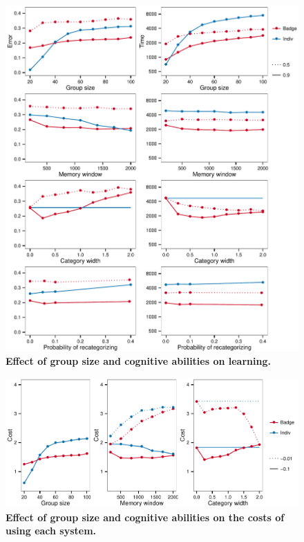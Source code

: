 \begin{figure}
\label{parameters}
\includegraphics[width=6.85in]{figures/parameters.pdf}
\caption{\sffamily\small\textbf{Effect of group size and cognitive abilities on learning.}}
\end{figure}

\begin{figure}
\label{costs}
\includegraphics[width=6.85in]{figures/costs.pdf}
\caption{\sffamily\small\textbf{Effect of group size and cognitive abilities on the costs of using each system.}}
\end{figure}

